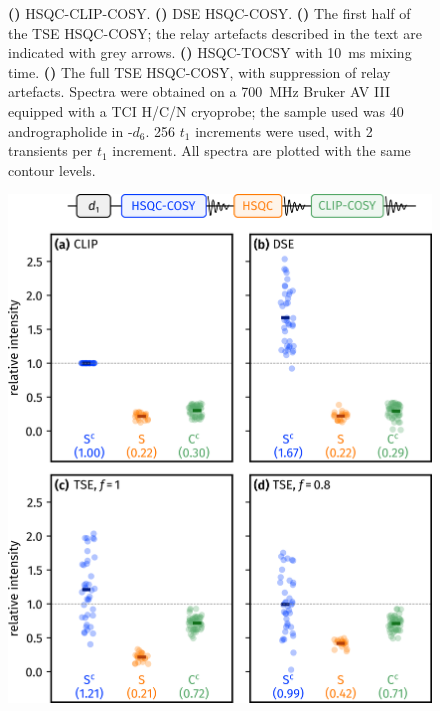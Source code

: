\documentclass[a4paper,12pt]{article}
\newcommand{\andro}{Spectra were obtained on a \SI{700}{\MHz} Bruker AV III equipped with a TCI H/C/N cryoprobe; the sample used was \SI{40}{\milli\molar} andrographolide in \ch{DMSO}-$d_6$.}
\begin{document}
\begin{refsection}
\begin{figure}[!htp]
{        \textbf{()} HSQC-CLIP-COSY.
        \textbf{()} DSE HSQC-COSY.
        \textbf{()} The first half of the TSE HSQC-COSY; the relay artefacts described in the text are indicated with grey arrows.
        \textbf{()} HSQC-TOCSY with \qty{10}{\ms} mixing time.
        \textbf{()} The full TSE HSQC-COSY, with suppression of relay artefacts.
        \andro{}
        256 $t_1$ increments were used, with 2 transients per $t_1$ increment.
        All spectra are plotted with the same contour levels.
    }
    \label{fig:hsqccosy_comp}
\end{figure}

\begin{figure}[!ht]
    \centering
    \includegraphics[]{hsqccosy_sens.png}%
    {\label{fig:hsqccosy_sens_clip}}%
    {\label{fig:hsqccosy_sens_dse}}%
    {\label{fig:hsqccosy_sens_tse_1}}%
    {\label{fig:hsqccosy_sens_tse_0p8}}%
    \caption[Sensitivity comparisons for  supersequences]{
}
\end{figure}
\end{refsection}
\end{document}
